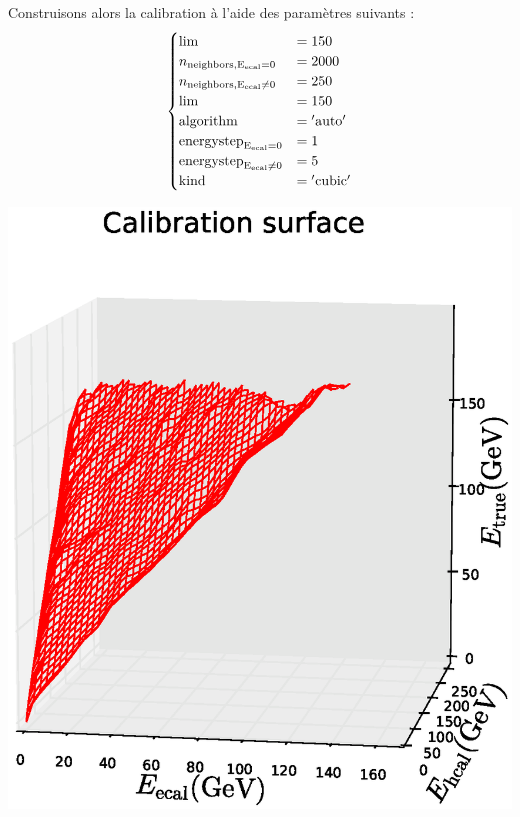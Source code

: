 \documentclass[11pt,a4paper]{article}
\begin{document}
\noindent
\begin{minipage}{0.6\linewidth}
Construisons alors la calibration  \cite{GitHubKNNGF} à l'aide des paramètres suivants : 
\[
\begin{cases}
\rm{lim} & = 150\\
n_{\rm neighbors, E_{\rm ecal} = 0} & = 2000\\
n_{\rm neighbors, E_{\rm ecal} \neq 0} & = 250\\
\rm{lim} & =150\\
\rm{algorithm} & = \rm{'auto'}\\
\rm{energystep}_{E_{\rm ecal} = 0} & = 1\\
\rm{energystep}_{E_{\rm ecal} \neq 0} & = 5\\
\rm{kind} & = \rm{'cubic'}\\
\end{cases}
\]
\end{minipage}
\begin{minipage}{0.4\linewidth}
	\includegraphics[width=\textwidth]{images/pictures/testKNNGF/KNNGaussianFit_plot3D_surf.eps}
	\label{surfKNNGF}
\end{minipage}
\end{document}
